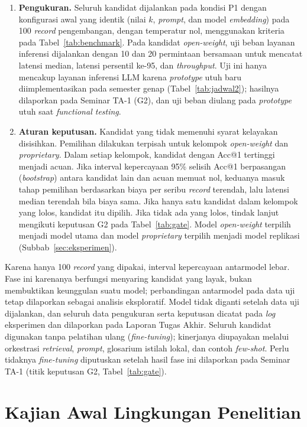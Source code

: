 \begin{enumerate}
  \item \textbf{Pengukuran.} Seluruh kandidat dijalankan pada kondisi P1 dengan konfigurasi awal yang identik (nilai $k$, \textit{prompt}, dan model \textit{embedding}) pada 100 \textit{record} pengembangan, dengan temperatur nol, menggunakan kriteria pada Tabel~\ref{tab:benchmark}. Pada kandidat \textit{open-weight}, uji beban layanan inferensi dijalankan dengan 10 dan 20 permintaan bersamaan untuk mencatat latensi median, latensi persentil ke-95, dan \textit{throughput}. Uji ini hanya mencakup layanan inferensi LLM karena \textit{prototype} utuh baru diimplementasikan pada semester genap (Tabel~\ref{tab:jadwal2}); hasilnya dilaporkan pada Seminar TA-1 (G2), dan uji beban diulang pada \textit{prototype} utuh saat \textit{functional testing}.
  \item \textbf{Aturan keputusan.} Kandidat yang tidak memenuhi syarat kelayakan disisihkan. Pemilihan dilakukan terpisah untuk kelompok \textit{open-weight} dan \textit{proprietary}. Dalam setiap kelompok, kandidat dengan Acc@1 tertinggi menjadi acuan. Jika interval kepercayaan 95\% selisih Acc@1 berpasangan (\textit{bootstrap}) antara kandidat lain dan acuan memuat nol, keduanya masuk tahap pemilihan berdasarkan biaya per seribu \textit{record} terendah, lalu latensi median terendah bila biaya sama. Jika hanya satu kandidat dalam kelompok yang lolos, kandidat itu dipilih. Jika tidak ada yang lolos, tindak lanjut mengikuti keputusan G2 pada Tabel~\ref{tab:gate}. Model \textit{open-weight} terpilih menjadi model utama dan model \textit{proprietary} terpilih menjadi model replikasi (Subbab~\ref{sec:eksperimen}).
\end{enumerate}

Karena hanya 100 \textit{record} yang dipakai, interval kepercayaan antarmodel lebar. Fase ini karenanya berfungsi menyaring kandidat yang layak, bukan membuktikan keunggulan suatu model; perbandingan antarmodel pada data uji tetap dilaporkan sebagai analisis eksploratif. Model tidak diganti setelah data uji dijalankan, dan seluruh data pengukuran serta keputusan dicatat pada \textit{log} eksperimen dan dilaporkan pada Laporan Tugas Akhir. Seluruh kandidat digunakan tanpa pelatihan ulang (\textit{fine-tuning}); kinerjanya diupayakan melalui orkestrasi \textit{retrieval}, \textit{prompt}, glosarium istilah lokal, dan contoh \textit{few-shot}. Perlu tidaknya \textit{fine-tuning} diputuskan setelah hasil fase ini dilaporkan pada Seminar TA-1 (titik keputusan G2, Tabel~\ref{tab:gate}).

\section{Kajian Awal Lingkungan Penelitian}
\label{sec:lingkungan}

